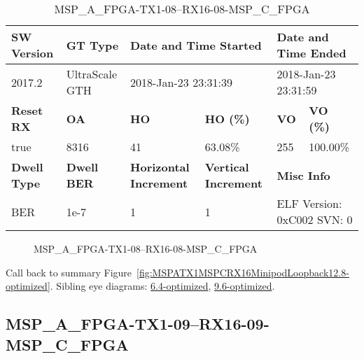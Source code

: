 \begin{table}[h]
\centering
\caption{MSP\_A\_FPGA-TX1-08--RX16-08-MSP\_C\_FPGA}
\label{tab:MSPAFPGATX108RX1608MSPCFPGA12.8-optimized}
\begin{tabular}{@{}|l|l|l|l|l|l|@{}}
\toprule
\textbf{SW Version}                & \textbf{GT Type}   & \multicolumn{2}{l|}{\textbf{Date and Time Started}}            & \multicolumn{2}{l|}{\textbf{Date and Time Ended}}        \\ \midrule
2017.2                       & UltraScale GTH          & \multicolumn{2}{l|}{2018-Jan-23 23:31:39}                   & \multicolumn{2}{l|}{2018-Jan-23 23:31:59}               \\ \midrule
\textbf{Reset RX}                  & \textbf{OA} & \textbf{HO}   & \textbf{HO (\%)} & \textbf{VO} & \textbf{VO (\%)} \\ \midrule
true & 8316        & 41          & 63.08\%        & 255        & 100.00\%       \\ \midrule
\textbf{Dwell Type}                & \textbf{Dwell BER} & \textbf{Horizontal Increment} & \textbf{Vertical Increment}    & \multicolumn{2}{l|}{\textbf{Misc Info}}                  \\ \midrule
BER                            & 1e-7        & 1        & 1           & \multicolumn{2}{l|}{ELF Version: 0xC002 SVN: 0}                         \\ \bottomrule
\end{tabular}
\end{table}

\begin{figure}[h]
\caption{MSP\_A\_FPGA-TX1-08--RX16-08-MSP\_C\_FPGA} \label{fig:MSPAFPGATX108RX1608MSPCFPGA12.8-optimized}
\end{figure}

Call back to summary Figure~\ref{fig:MSPATX1MSPCRX16MinipodLoopback12.8-optimized}.
Sibling eye diagrams: \hyperref[sec:MSPAFPGATX108RX1608MSPCFPGA6.4-optimized]{6.4-optimized}, \hyperref[sec:MSPAFPGATX108RX1608MSPCFPGA9.6-optimized]{9.6-optimized}.

\clearpage
\newpage


\subsection{MSP\_A\_FPGA-TX1-09--RX16-09-MSP\_C\_FPGA}\label{sec:MSPAFPGATX109RX1609MSPCFPGA12.8-optimized}

